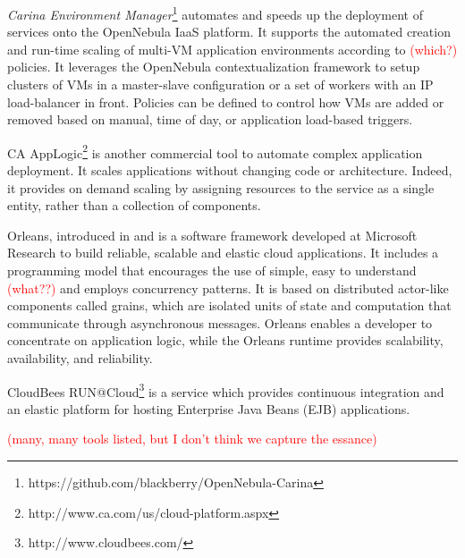 \documentclass{sig-alternate}
\newcommand\todo[1]{\textcolor{red}{(#1)}}
\begin{document}
\emph{Carina Environment Manager}\footnote{https://github.com/blackberry/OpenNebula-Carina} automates and speeds up the deployment of services onto the OpenNebula IaaS platform. It supports the automated creation and run-time scaling of multi-VM application environments according to \todo{which?} policies. It leverages the OpenNebula contextualization framework to setup clusters of VMs in a master-slave configuration or a set of workers with an IP load-balancer in front. Policies can be defined to control how VMs are added or removed based on manual, time of day, or application load-based triggers.

CA AppLogic\footnote{http://www.ca.com/us/cloud-platform.aspx} is another commercial tool to automate complex application deployment. It scales applications without changing code or architecture. Indeed, it provides on demand scaling by assigning resources to the service as a single entity, rather than a collection of components.

Orleans, introduced in \cite{larus2013look} and \cite{bykov2011orleans} is a software framework developed at Microsoft Research to build reliable, scalable and elastic cloud applications. It includes a programming model that encourages the use of simple, easy to understand \todo{what??} and employs concurrency patterns. 
It is based on distributed actor-like components called grains, which are isolated units of state and computation that communicate through asynchronous messages. Orleans enables a developer to concentrate on application logic, while the Orleans runtime provides scalability, availability, and reliability.

CloudBees RUN@Cloud\footnote{http://www.cloudbees.com/} is a service which provides continuous integration and an elastic platform for hosting Enterprise Java Beans (EJB) applications.

\todo{many, many tools listed, but I don't think we capture the essance}
\end{document}
